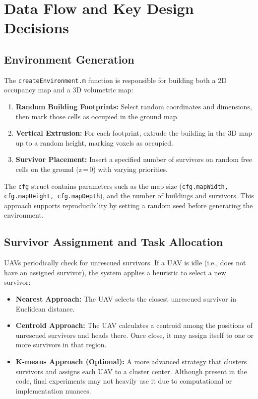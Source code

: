 \documentclass[12pt,a4paper]{report}
\begin{document}
\section{Data Flow and Key Design Decisions}
\label{sec:dataflow_design}

\subsection{Environment Generation}
\label{sec:env_gen}
The \texttt{createEnvironment.m} function is responsible for building both a 2D occupancy map 
and a 3D volumetric map:
\begin{enumerate}
    \item \textbf{Random Building Footprints:} 
          Select random coordinates and dimensions, then mark those cells as occupied 
          in the ground map.
    \item \textbf{Vertical Extrusion:}
          For each footprint, extrude the building in the 3D map up to a random height, 
          marking voxels as occupied.
    \item \textbf{Survivor Placement:}
          Insert a specified number of survivors on random free cells on the ground 
          (z\,=\,0) with varying priorities.
\end{enumerate}

The \texttt{cfg} struct contains parameters such as the map size (\texttt{cfg.mapWidth, 
cfg.mapHeight, cfg.mapDepth}), and the number of buildings and survivors. This approach 
supports reproducibility by setting a random seed before generating the environment.

\subsection{Survivor Assignment and Task Allocation}
\label{sec:survivor_allocation}
UAVs periodically check for unrescued survivors. If a UAV is idle (i.e., does not have 
an assigned survivor), the system applies a heuristic to select a new survivor:

\begin{itemize}
    \item \textbf{Nearest Approach:}
          The UAV selects the closest unrescued survivor in Euclidean distance.
    \item \textbf{Centroid Approach:}
          The UAV calculates a centroid among the positions of unrescued survivors 
          and heads there. Once close, it may assign itself to one or more survivors 
          in that region.
    \item \textbf{K-means Approach (Optional):}
          A more advanced strategy that clusters survivors and assigns each UAV to 
          a cluster center. Although present in the code, final experiments may not 
          heavily use it due to computational or implementation nuances.
\end{itemize}
\end{document}

